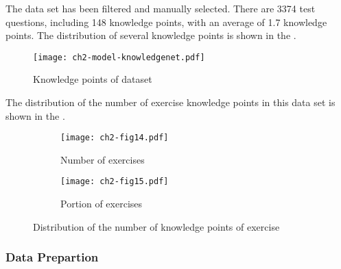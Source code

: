 The data set has been filtered and manually selected. There are 3374 test questions, including 148 knowledge points, with an average of 1.7 knowledge points. The distribution of several knowledge points is shown in the \figname{\ref{fig:ch2-model-knowledgenet}}.
\begin{figure}[htbp!]
    \centering
    \texttt{[image: ch2-model-knowledgenet.pdf]}
    \caption{Knowledge points of dataset}\label{fig:ch2-model-knowledgenet}
\end{figure}

The distribution of the number of exercise knowledge points in this data set is shown in the \figname{\ref{ch2-fig14}}.
\begin{figure}[htbp!]
    \centering
    \begin{subfigure}[b]{0.475\textwidth}
        \texttt{[image: ch2-fig14.pdf]}
        \caption[dis]{Number of exercises}\label{fig:ch2-fig14-hist}
    \end{subfigure}
    \begin{subfigure}[b]{0.475\textwidth}
        \texttt{[image: ch2-fig15.pdf]}
        \caption{Portion of exercises}\label{fig:ch2-fig14-pie}
    \end{subfigure}
    \caption{Distribution of the number of knowledge points of exercise}\label{ch2-fig14}
\end{figure}

\subsubsection{Data Prepartion}
